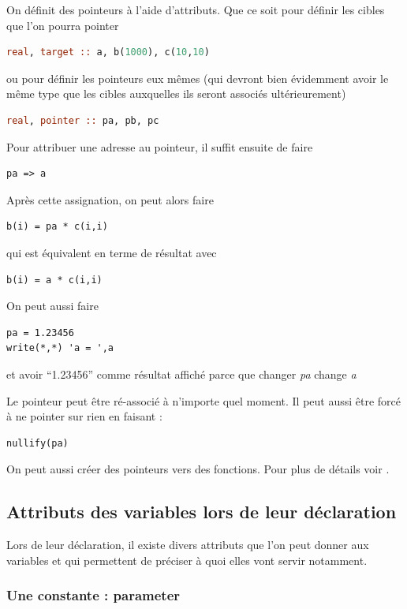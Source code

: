 \documentclass[a4paper,twoside]{article}
\begin{document}
On définit des pointeurs à l'aide d'attributs. Que ce soit pour définir les cibles que l'on pourra pointer
\begin{lstlisting}[language=Fortran]
real, target :: a, b(1000), c(10,10)
\end{lstlisting}
ou pour définir les pointeurs eux mêmes (qui devront bien évidemment avoir le même type que les cibles auxquelles ils seront associés ultérieurement)
\begin{lstlisting}[language=Fortran]
real, pointer :: pa, pb, pc
\end{lstlisting}

Pour attribuer une adresse au pointeur, il suffit ensuite de faire
\begin{verbatim}
pa => a
\end{verbatim}

Après cette assignation, on peut alors faire 
\begin{verbatim}
b(i) = pa * c(i,i)
\end{verbatim}
qui est équivalent en terme de résultat avec
\begin{verbatim}
b(i) = a * c(i,i)
\end{verbatim}

\bigskip

On peut aussi faire 
\begin{verbatim}
pa = 1.23456
write(*,*) 'a = ',a
\end{verbatim}
et avoir ``1.23456'' comme résultat affiché parce que changer \textit{pa} change \textit{a}

\bigskip

Le pointeur peut être ré-associé à n'importe quel moment. Il peut aussi être forcé à ne pointer sur rien en faisant : 
\begin{verbatim}
nullify(pa)
\end{verbatim}

\bigskip

On peut aussi créer des pointeurs vers des fonctions. Pour plus de détails voir .

\subsection{Attributs des variables lors de leur déclaration}
Lors de leur déclaration, il existe divers attributs que l'on peut donner aux variables et qui permettent de préciser à quoi elles vont servir notamment. 

\subsubsection{Une constante : parameter}
\end{document}
